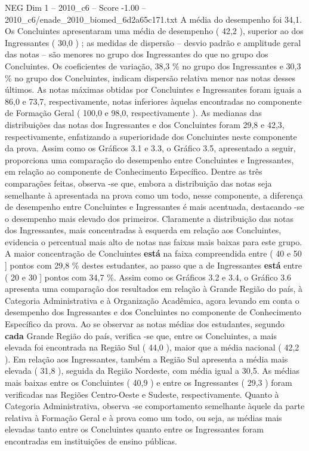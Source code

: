 \begin{textsample}{NEG Dim 1 – 2010\_c6 – Score -1.00 – 2010\_c6/enade\_2010\_biomed\_6d2a65c171.txt}
A média do desempenho foi 34,1.
Os Concluintes apresentaram uma média de desempenho ( 42,2 ), superior ao dos Ingressantes ( 30,0 ) ; as medidas de dispersão – desvio padrão e amplitude geral das notas – são menores no grupo dos Ingressantes do que no grupo dos Concluintes.
Os coeficientes de variação, 38,3 \% no grupo dos Ingressantes e 30,3 \% no grupo dos Concluintes, indicam dispersão relativa menor nas notas desses últimos.
As notas máximas obtidas por Concluintes e Ingressantes foram iguais a 86,0 e 73,7, respectivamente, notas inferiores àquelas encontradas no componente de Formação Geral ( 100,0 e 98,0, respectivamente ).
As medianas das distribuições das notas dos Ingressantes e dos Concluintes foram 29,8 e 42,3, respectivamente, enfatizando a superioridade dos Concluintes neste componente da prova.
Assim como os Gráficos 3.1 e 3.3, o Gráfico 3.5, apresentado a seguir, proporciona uma comparação do desempenho entre Concluintes e Ingressantes, em relação ao componente de Conhecimento Específico.
Dentre as três comparações feitas, observa -se que, embora a distribuição das notas seja semelhante à apresentada na prova como um todo, nesse componente, a diferença de desempenho entre Concluintes e Ingressantes é mais acentuada, destacando -se o desempenho mais elevado dos primeiros.
Claramente a distribuição das notas dos Ingressantes, mais concentradas à esquerda em relação aos Concluintes, evidencia o percentual mais alto de notas nas faixas mais baixas para este grupo.
A maior concentração de Concluintes \textbf{está} na faixa compreendida entre ( 40 e 50 ] pontos com 29,8 \% destes estudantes, ao passo que a de Ingressantes \textbf{está} entre ( 20 e 30 ] pontos com 34,7 \%.
Assim como os Gráficos 3.2 e 3.4, o Gráfico 3.6 apresenta uma comparação dos resultados em relação à Grande Região do país, à Categoria Administrativa e à Organização Acadêmica, agora levando em conta o desempenho dos Ingressantes e dos Concluintes no componente de Conhecimento Específico da prova.
Ao se observar as notas médias dos estudantes, segundo \textbf{cada} Grande Região do país, verifica -se que, entre os Concluintes, a mais elevada foi encontrada na Região Sul ( 44,0 ), maior que a média nacional ( 42,2 ).
Em relação aos Ingressantes, também a Região Sul apresenta a média mais elevada ( 31,8 ), seguida da Região Nordeste, com média igual a 30,5.
As médias mais baixas entre os Concluintes ( 40,9 ) e entre os Ingressantes ( 29,3 ) foram verificadas nas Regiões Centro-Oeste e Sudeste, respectivamente.
Quanto à Categoria Administrativa, observa -se comportamento semelhante àquele da parte relativa à Formação Geral e à prova como um todo, ou seja, as médias mais elevadas tanto entre os Concluintes quanto entre os Ingressantes foram encontradas em instituições de ensino públicas.

\end{textsample}
